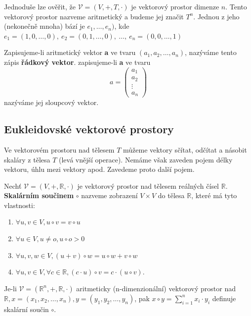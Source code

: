 Jednoduše lze ověřit, že $\mathscr{V} = (V,+,T,\cdot)$ je vektorový prostor dimenze $n$. Tento vektorový prostor nazveme aritmetický a budeme jej značit $T^n$. Jednou z jeho (nekonečně mnoha) bází je $e_1, \dots, e_n)$, kde $e_1 = (1,0,\dots, 0),\ e_2 = (0,1,\dots, 0),\ \dots, \ e_n = (0,0,\dots, 1)$ 

Zapisujeme-li aritmetický vektor \textbf{a} ve tvaru $(a_1,a_2, \dots, a_n)$, nazýváme tento zápis \textbf{řádkový vektor}. zapisujeme-li \textbf{a} ve tvaru 
\begin{displaymath}
	a = \left( 
	 \begin{array}{c}
		a_1\\ a_2 \\ \vdots \\ a_n
	\end{array}\right)
\end{displaymath}
nazýváme jej sloupcový vektor.
\subsection{Eukleidovské vektorové prostory}
Ve vektorovém prostoru nad tělesem $T$ můžeme vektory sčítat, odčítat a násobit skaláry z tělesa $T$ (levá vnější operace). Nemáme však zaveden pojem délky vektoru, úhlu mezi vektory apod. Zavedeme proto další pojem.

\begin{definition}
	Nechť $\mathscr{V} = (V, +, \mathbb{R}, \cdot)$ je vektorový prostor nad tělesem reálných čísel $\mathbb{R}$. \textbf{Skalárním součinem} $\circ$ nazveme zobrazení $V \times V$ do tělesa $\mathbb{R}$, které má tyto vlastnosti:
	\begin{enumerate}
		\item $\forall u,v \in V, u \circ v = v \circ u$
		\item $\forall u \in V, u \not= o, u \circ o > 0$
		\item $\forall u,v,w \in V, (u + v) \circ w = u \circ w + v \circ w$
		\item $\forall u,v \in V, \forall c \in \mathbb{R}, (c \cdot u) \circ v = c \cdot (u \circ v)$.
	\end{enumerate}
\end{definition}

\begin{example}
	Je-li $\mathscr{V} = (\mathbb{R}^n, +, \mathbb{R}, \cdot)$ aritmeticky (n-dimenzionální) vektorový prostor nad $\mathbb{R}, x = (x_1,x_2, \dots, x_n), y = (y_1,y_2, \dots, y_n)$, pak $x \circ y = \sum^n_{i=1} x_i \cdot y_i$ definuje skalární součin $\circ$.
\end{example}

